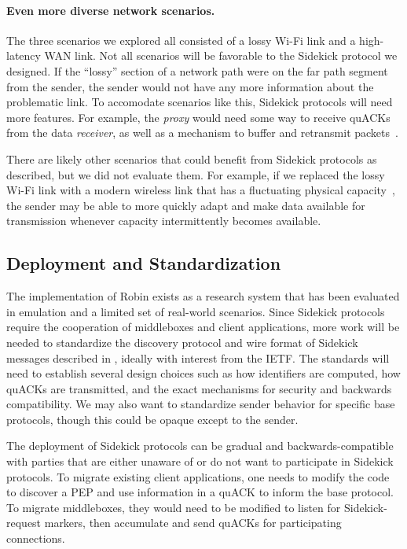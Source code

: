 \paragraph{Even more diverse network scenarios.}
The three scenarios we explored all consisted of a lossy Wi-Fi link and a
high-latency WAN link. Not all scenarios will be favorable to the
Sidekick protocol we designed.
If the ``lossy'' section of a network path were on the far path segment from the
sender, the sender would not have any more information about the problematic
link. To accomodate scenarios like this, Sidekick protocols will need
more features. For example, the \emph{proxy} would need some way to receive
quACKs from the data \emph{receiver}, as well as a mechanism to buffer and
retransmit packets~\cite{balakrishnan1995snoop,caini2006pepsal}.

There are likely other scenarios that could benefit from Sidekick protocols as
described, but we did not evaluate them. For example, if we replaced the lossy Wi-Fi
link with a modern wireless link that has a fluctuating physical
capacity~\cite{niu2015survey,burchardt2014vlc,koenig2013wireless},
the sender may be able to more quickly adapt and make
data available for transmission whenever capacity intermittently becomes available.

\subsection{Deployment and Standardization}

The implementation of Robin exists as a research system that has been evaluated
in emulation and a limited set of real-world scenarios. Since Sidekick protocols
require the cooperation of middleboxes and client applications, more work will
be needed to standardize the discovery protocol and wire format of Sidekick messages
described in , ideally with interest from the IETF.
The standards will need to establish several design choices such as how
identifiers are computed, how quACKs are transmitted, and the exact mechanisms
for security and backwards compatibility.
We may also want to standardize sender behavior for specific base protocols,
though this could be opaque except to the sender.

The deployment of Sidekick protocols can be gradual and backwards-compatible
with parties that are either unaware of or do not want to participate in Sidekick
protocols.
To migrate existing client applications, one needs to modify the code to
discover a PEP and use information in a quACK to inform the base protocol.
To migrate middleboxes, they would need to be modified to listen for
Sidekick-request markers, then accumulate and send quACKs for participating
connections.

